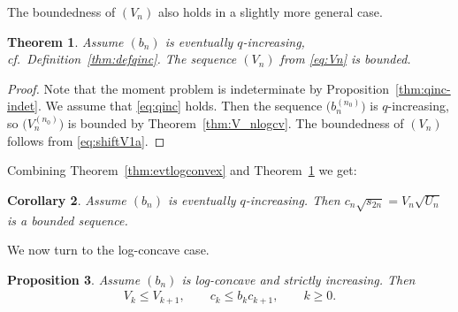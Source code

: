 \documentclass[pdftex]{sigma}
\numberwithin{equation}{section}
\newtheorem{thm}{Theorem}[section]
\newtheorem{prop}[thm]{Proposition}
\newtheorem{cor}[thm]{Corollary}
{ \theoremstyle{definition}
\newtheorem{defn}[thm]{Definition}
\newtheorem{ex}[thm]{Example}
 \newtheorem{rem}[thm]{Remark}}
\begin{document}
The boundedness of $(V_n)$ also holds in a slightly more general case.

\begin{thm}\label{thm:Vevtlogconv} Assume $(b_n)$ is eventually $q$-increasing, cf.\ Definition~{\rm \ref{thm:defqinc}}. The sequence $(V_n)$ from \eqref{eq:Vn} is bounded.
\end{thm}

\begin{proof} Note that the moment problem is indeterminate by Proposition~\ref{thm:qinc-indet}. We assume that \eqref{eq:qinc} holds. Then the sequence $\big(b_n^{(n_0)}\big)$ is $q$-increasing, so $\big(V_n^{(n_0)}\big)$ is bounded by Theorem~\ref{thm:V_nlogcv}. The boundedness of $(V_n)$ follows from \eqref{eq:shiftV1a}.
\end{proof}

Combining Theorem~\ref{thm:evtlogconvex} and Theorem~\ref{thm:Vevtlogconv} we get:

\begin{cor}\label{thm:VnsqrtUn} Assume $(b_n)$ is eventually $q$-increasing. Then $c_n\sqrt{s_{2n}}=V_n\sqrt{U_n}$ is a bounded sequence.
\end{cor}

We now turn to the log-concave case.

\begin{prop}\label{thm:aV_k} Assume $(b_n)$ is log-concave and strictly increasing. Then
\begin{gather*}
V_k\le V_{k+1}, \qquad c_k\le b_kc_{k+1}, \qquad k\ge 0.
\end{gather*}
\end{prop}
\end{document}
